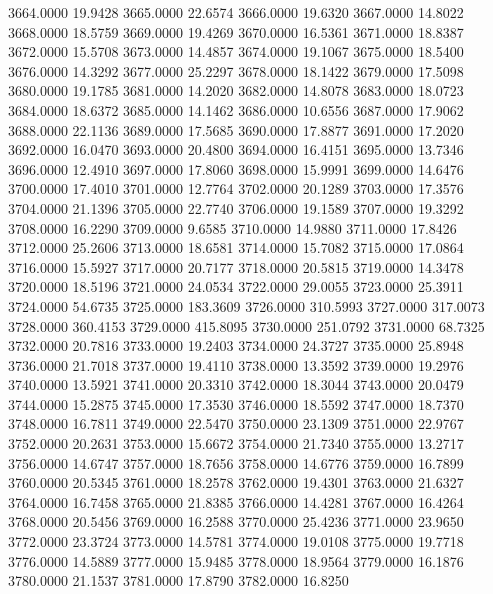 3664.0000     19.9428
3665.0000     22.6574
3666.0000     19.6320
3667.0000     14.8022
3668.0000     18.5759
3669.0000     19.4269
3670.0000     16.5361
3671.0000     18.8387
3672.0000     15.5708
3673.0000     14.4857
3674.0000     19.1067
3675.0000     18.5400
3676.0000     14.3292
3677.0000     25.2297
3678.0000     18.1422
3679.0000     17.5098
3680.0000     19.1785
3681.0000     14.2020
3682.0000     14.8078
3683.0000     18.0723
3684.0000     18.6372
3685.0000     14.1462
3686.0000     10.6556
3687.0000     17.9062
3688.0000     22.1136
3689.0000     17.5685
3690.0000     17.8877
3691.0000     17.2020
3692.0000     16.0470
3693.0000     20.4800
3694.0000     16.4151
3695.0000     13.7346
3696.0000     12.4910
3697.0000     17.8060
3698.0000     15.9991
3699.0000     14.6476
3700.0000     17.4010
3701.0000     12.7764
3702.0000     20.1289
3703.0000     17.3576
3704.0000     21.1396
3705.0000     22.7740
3706.0000     19.1589
3707.0000     19.3292
3708.0000     16.2290
3709.0000      9.6585
3710.0000     14.9880
3711.0000     17.8426
3712.0000     25.2606
3713.0000     18.6581
3714.0000     15.7082
3715.0000     17.0864
3716.0000     15.5927
3717.0000     20.7177
3718.0000     20.5815
3719.0000     14.3478
3720.0000     18.5196
3721.0000     24.0534
3722.0000     29.0055
3723.0000     25.3911
3724.0000     54.6735
3725.0000    183.3609
3726.0000    310.5993
3727.0000    317.0073
3728.0000    360.4153
3729.0000    415.8095
3730.0000    251.0792
3731.0000     68.7325
3732.0000     20.7816
3733.0000     19.2403
3734.0000     24.3727
3735.0000     25.8948
3736.0000     21.7018
3737.0000     19.4110
3738.0000     13.3592
3739.0000     19.2976
3740.0000     13.5921
3741.0000     20.3310
3742.0000     18.3044
3743.0000     20.0479
3744.0000     15.2875
3745.0000     17.3530
3746.0000     18.5592
3747.0000     18.7370
3748.0000     16.7811
3749.0000     22.5470
3750.0000     23.1309
3751.0000     22.9767
3752.0000     20.2631
3753.0000     15.6672
3754.0000     21.7340
3755.0000     13.2717
3756.0000     14.6747
3757.0000     18.7656
3758.0000     14.6776
3759.0000     16.7899
3760.0000     20.5345
3761.0000     18.2578
3762.0000     19.4301
3763.0000     21.6327
3764.0000     16.7458
3765.0000     21.8385
3766.0000     14.4281
3767.0000     16.4264
3768.0000     20.5456
3769.0000     16.2588
3770.0000     25.4236
3771.0000     23.9650
3772.0000     23.3724
3773.0000     14.5781
3774.0000     19.0108
3775.0000     19.7718
3776.0000     14.5889
3777.0000     15.9485
3778.0000     18.9564
3779.0000     16.1876
3780.0000     21.1537
3781.0000     17.8790
3782.0000     16.8250
